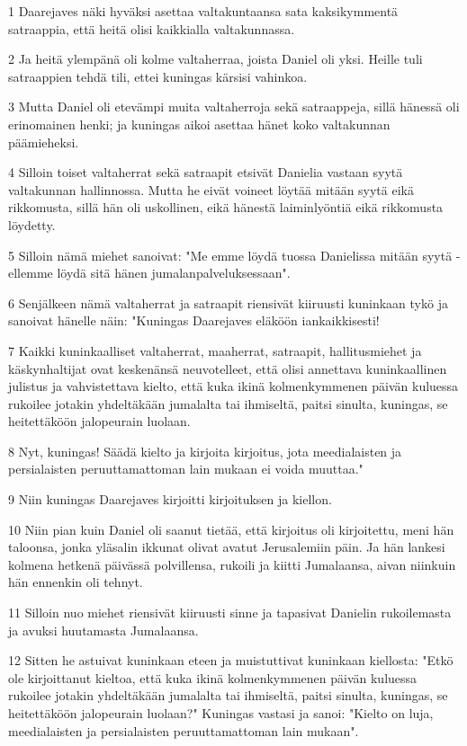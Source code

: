 \par 1 Daarejaves näki hyväksi asettaa valtakuntaansa sata kaksikymmentä satraappia, että heitä olisi kaikkialla valtakunnassa.
\par 2 Ja heitä ylempänä oli kolme valtaherraa, joista Daniel oli yksi. Heille tuli satraappien tehdä tili, ettei kuningas kärsisi vahinkoa.
\par 3 Mutta Daniel oli etevämpi muita valtaherroja sekä satraappeja, sillä hänessä oli erinomainen henki; ja kuningas aikoi asettaa hänet koko valtakunnan päämieheksi.
\par 4 Silloin toiset valtaherrat sekä satraapit etsivät Danielia vastaan syytä valtakunnan hallinnossa. Mutta he eivät voineet löytää mitään syytä eikä rikkomusta, sillä hän oli uskollinen, eikä hänestä laiminlyöntiä eikä rikkomusta löydetty.
\par 5 Silloin nämä miehet sanoivat: "Me emme löydä tuossa Danielissa mitään syytä - ellemme löydä sitä hänen jumalanpalveluksessaan".
\par 6 Senjälkeen nämä valtaherrat ja satraapit riensivät kiiruusti kuninkaan tykö ja sanoivat hänelle näin: "Kuningas Daarejaves eläköön iankaikkisesti!
\par 7 Kaikki kuninkaalliset valtaherrat, maaherrat, satraapit, hallitusmiehet ja käskynhaltijat ovat keskenänsä neuvotelleet, että olisi annettava kuninkaallinen julistus ja vahvistettava kielto, että kuka ikinä kolmenkymmenen päivän kuluessa rukoilee jotakin yhdeltäkään jumalalta tai ihmiseltä, paitsi sinulta, kuningas, se heitettäköön jalopeurain luolaan.
\par 8 Nyt, kuningas! Säädä kielto ja kirjoita kirjoitus, jota meedialaisten ja persialaisten peruuttamattoman lain mukaan ei voida muuttaa."
\par 9 Niin kuningas Daarejaves kirjoitti kirjoituksen ja kiellon.
\par 10 Niin pian kuin Daniel oli saanut tietää, että kirjoitus oli kirjoitettu, meni hän taloonsa, jonka yläsalin ikkunat olivat avatut Jerusalemiin päin. Ja hän lankesi kolmena hetkenä päivässä polvillensa, rukoili ja kiitti Jumalaansa, aivan niinkuin hän ennenkin oli tehnyt.
\par 11 Silloin nuo miehet riensivät kiiruusti sinne ja tapasivat Danielin rukoilemasta ja avuksi huutamasta Jumalaansa.
\par 12 Sitten he astuivat kuninkaan eteen ja muistuttivat kuninkaan kiellosta: "Etkö ole kirjoittanut kieltoa, että kuka ikinä kolmenkymmenen päivän kuluessa rukoilee jotakin yhdeltäkään jumalalta tai ihmiseltä, paitsi sinulta, kuningas, se heitettäköön jalopeurain luolaan?" Kuningas vastasi ja sanoi: "Kielto on luja, meedialaisten ja persialaisten peruuttamattoman lain mukaan".
